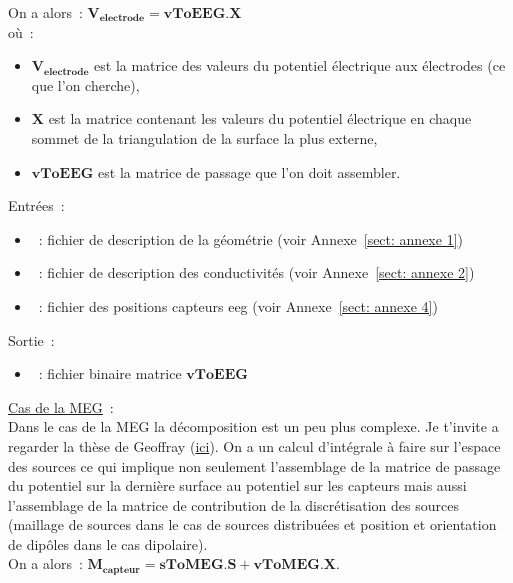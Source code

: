 \medskip

\noindent
On a alors~: $\mathbf{V_{electrode}} = \mathbf{vToEEG} . \mathbf{X}$\\
où~:\\ 
\begin{itemize}
    \item $\mathbf{V_{electrode}}$ est la matrice des valeurs du potentiel électrique aux électrodes (ce que l'on cherche),
    \item $\mathbf{X}$ est la matrice contenant les valeurs du potentiel électrique en chaque sommet de la triangulation de la
          surface la plus externe,
    \item $\mathbf{vToEEG}$ est la matrice de passage que l'on doit assembler.
\end{itemize}

\bigskip

\noindent
Entrées~:
\begin{itemize}
    \item {}~: fichier de description de la géométrie (voir Annexe~\ref{sect: annexe 1})
    \item {}~: fichier de description des conductivités (voir Annexe~\ref{sect: annexe 2})
    \item {}~: fichier des positions capteurs eeg (voir Annexe~\ref{sect: annexe 4})
\end{itemize}
Sortie~:
\begin{itemize}
    \item {}~: fichier binaire matrice $\mathbf{vToEEG}$
\end{itemize}

\medskip

\noindent
{}

\bigskip

\checkItem \underline{Cas de la MEG}~:\\
Dans le cas de la MEG la décomposition est un peu plus complexe. Je t'invite a regarder la thèse de Geoffray
(\href{http://pastel.paristech.org/1593/}{ici}). On a un calcul d'intégrale à faire sur l'espace des sources ce qui implique non
seulement l'assemblage de la matrice de passage du potentiel sur la dernière surface au potentiel sur les capteurs mais aussi
l'assemblage de la matrice de contribution de la discrétisation des sources (maillage de sources dans le cas de sources
distribuées et position et orientation de dipôles dans le cas dipolaire).\\
On a alors~: $\mathbf{M_{capteur}} = \mathbf{sToMEG} . \mathbf{S} + \mathbf{vToMEG}.\mathbf{X}$.


